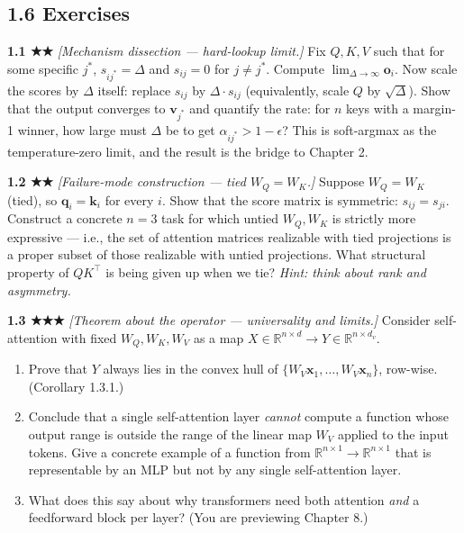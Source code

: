 \documentclass[
]{article}
\begin{document}
\hypertarget{exercises}{%
\subsection{1.6 Exercises}\label{exercises}}

\textbf{1.1 ★★} \emph{{[}Mechanism dissection --- hard-lookup limit.{]}}
Fix \(Q, K, V\) such that for some specific \(j^*\),
\(s_{ij^*} = \Delta\) and \(s_{ij} = 0\) for \(j \ne j^*\). Compute
\(\lim_{\Delta \to \infty} \mathbf{o}_i\). Now scale the scores by
\(\Delta\) itself: replace \(s_{ij}\) by \(\Delta \cdot s_{ij}\)
(equivalently, scale \(Q\) by \(\sqrt{\Delta}\)). Show that the output
converges to \(\mathbf{v}_{j^*}\) and quantify the rate: for \(n\) keys
with a margin-1 winner, how large must \(\Delta\) be to get
\(\alpha_{ij^*} > 1 - \epsilon\)? This is soft-argmax as the
temperature-zero limit, and the result is the bridge to Chapter 2.

\textbf{1.2 ★★} \emph{{[}Failure-mode construction --- tied
\(W_Q = W_K\).{]}} Suppose \(W_Q = W_K\) (tied), so
\(\mathbf{q}_i = \mathbf{k}_i\) for every \(i\). Show that the score
matrix is symmetric: \(s_{ij} = s_{ji}\). Construct a concrete \(n = 3\)
task for which untied \(W_Q, W_K\) is strictly more expressive --- i.e.,
the set of attention matrices realizable with tied projections is a
proper subset of those realizable with untied projections. What
structural property of \(QK^\top\) is being given up when we tie?
\emph{Hint: think about rank and asymmetry.}

\textbf{1.3 ★★★} \emph{{[}Theorem about the operator --- universality
and limits.{]}} Consider self-attention with fixed \(W_Q, W_K, W_V\) as
a map
\(X \in \mathbb{R}^{n \times d} \to Y \in \mathbb{R}^{n \times d_v}\).

\begin{enumerate}
\def\labelenumi{(\alph{enumi})}
\item
  Prove that \(Y\) always lies in the convex hull of
  \(\{W_V \mathbf{x}_1, \dots, W_V \mathbf{x}_n\}\), row-wise.
  (Corollary 1.3.1.)
\item
  Conclude that a single self-attention layer \emph{cannot} compute a
  function whose output range is outside the range of the linear map
  \(W_V\) applied to the input tokens. Give a concrete example of a
  function from \(\mathbb{R}^{n \times 1} \to \mathbb{R}^{n \times 1}\)
  that is representable by an MLP but not by any single self-attention
  layer.
\item
  What does this say about why transformers need both attention
  \emph{and} a feedforward block per layer? (You are previewing Chapter
  8.)
\end{enumerate}
\end{document}
